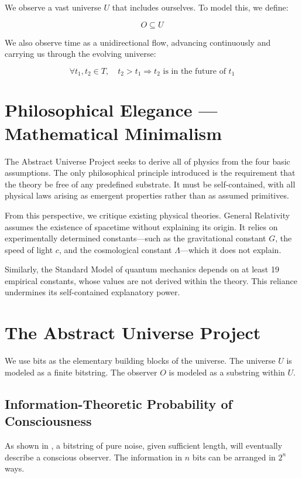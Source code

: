 \documentclass[11pt]{article}
\begin{document}
We observe a vast universe \( U \) that includes ourselves. To model this, we define:

\[
      O \subseteq U
\]

We also observe time as a unidirectional flow, advancing continuously and carrying us through the evolving universe:

\[
      \forall t_1, t_2 \in T,\quad t_2 > t_1 \Rightarrow t_2 \text{ is in the future of } t_1
\]

\section{Philosophical Elegance — Mathematical Minimalism}

The Abstract Universe Project seeks to derive all of physics from the four basic assumptions. The only philosophical principle introduced is the requirement that the theory be free of any predefined substrate. It must be self-contained, with all physical laws arising as emergent properties rather than as assumed primitives.

From this perspective, we critique existing physical theories. General Relativity assumes the existence of spacetime without explaining its origin. It relies on experimentally determined constants—such as the gravitational constant \(G\), the speed of light \(c\), and the cosmological constant \(\Lambda\)—which it does not explain.

Similarly, the Standard Model of quantum mechanics depends on at least 19 empirical constants, whose values are not derived within the theory. This reliance undermines its self-contained explanatory power.

\section{The Abstract Universe Project}

We use bits as the elementary building blocks of the universe. The universe \(U\) is modeled as a finite bitstring. The observer \(O\) is modeled as a substring within \(U\).

\subsection{Information-Theoretic Probability of Consciousness}

As shown in \cite{meskanen2019}, a bitstring of pure noise, given sufficient length, will eventually describe a conscious observer. The information in \(n\) bits can be arranged in \(2^n\) ways.
\end{document}
